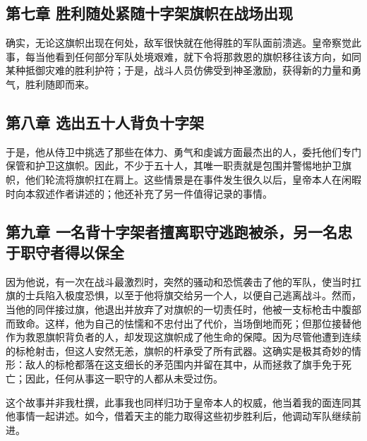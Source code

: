 
\subsection{第七章 胜利随处紧随十字架旗帜在战场出现}

确实，无论这旗帜出现在何处，敌军很快就在他得胜的军队面前溃逃。皇帝察觉此事，每当他看到任何部分军队处境艰难，就下令将那救恩的旗帜移往该方向，如同某种抵御灾难的胜利护符；于是，战斗人员仿佛受到神圣激励，获得新的力量和勇气，胜利随即而来。\par


\subsection{第八章 选出五十人背负十字架}

于是，他从侍卫中挑选了那些在体力、勇气和虔诚方面最杰出的人，委托他们专门保管和护卫这旗帜。因此，不少于五十人，其唯一职责就是包围并警惕地护卫旗帜，他们轮流将旗帜扛在肩上。这些情景是在事件发生很久以后，皇帝本人在闲暇时向本叙述作者讲述的；他还补充了另一件值得记录的事情。\par


\subsection{第九章 一名背十字架者擅离职守逃跑被杀，另一名忠于职守者得以保全}

因为他说，有一次在战斗最激烈时，突然的骚动和恐慌袭击了他的军队，使当时扛旗的士兵陷入极度恐惧，以至于他将旗交给另一个人，以便自己逃离战斗。然而，当他的同伴接过旗，他退出并放弃了对旗帜的一切责任时，他被一支标枪击中腹部而致命。这样，他为自己的怯懦和不忠付出了代价，当场倒地而死；但那位接替他作为救恩旗帜背负者的人，却发现这旗帜成了他生命的保障。因为尽管他遭到连续的标枪射击，但这人安然无恙，旗帜的杆承受了所有武器。这确实是极其奇妙的情形：敌人的标枪都落在这支细长的矛范围内并留在其中，从而拯救了旗手免于死亡；因此，任何从事这一职守的人都从未受过伤。\par

这个故事并非我杜撰，此事我也同样归功于皇帝本人的权威，他当着我的面连同其他事情一起讲述。如今，借着天主的能力取得这些初步胜利后，他调动军队继续前进。\par

